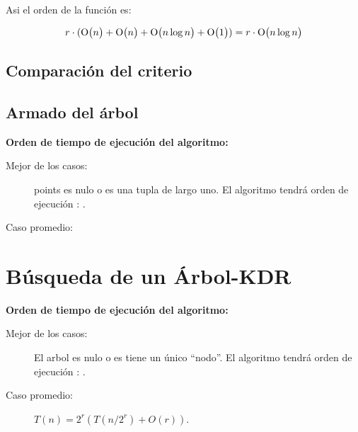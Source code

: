 Asi el orden de la función  es:

\[ r \cdot (\mathrm{O}\bigl(n\bigr)+\mathrm{O}\bigl(n\bigr)+\mathrm{O}\bigl(n \log{n}\bigr) + \mathrm{O}\bigl(1\bigr)) \\
   = r \cdot \mathrm{O}\bigl(n \log{n}\bigr)  \]

\subsection{Comparación del criterio}


\subsection{Armado del árbol}



\textbf{Orden de tiempo de ejecución del algoritmo:}
\begin{description}
\item[Mejor de los casos:] points es nulo o es una tupla de largo uno.
  El algoritmo tendrá orden de ejecución : .
\item[Caso promedio:] 
\end{description}



\section{Búsqueda de un Árbol-KDR}



\textbf{Orden de tiempo de ejecución del algoritmo:}
\begin{description}
\item[Mejor de los casos:] El arbol es nulo o es tiene un único ``nodo''.
  El algoritmo tendrá orden de ejecución : .
\item[Caso promedio:] \(T(n)= 2^r (T(n/2^r)+ O(r))\).
\end{description}


